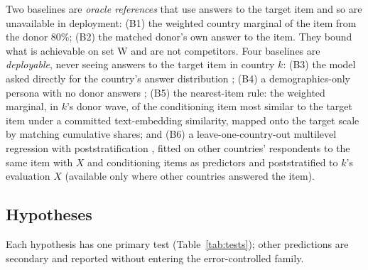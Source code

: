 \documentclass[10pt]{article}
\begin{document}
Two baselines are \emph{oracle references} that use answers to the target item and so are unavailable in deployment: (B1) the weighted country marginal of the item from the donor 80\%; (B2) the matched donor's own answer to the item. They bound what is achievable on set W and are not competitors. Four baselines are \emph{deployable}, never seeing answers to the target item in country $k$: (B3) the model asked directly for the country's answer distribution \citep{jang2026,meister2025}; (B4) a demographics-only persona with no donor answers \citep{argyle2023}; (B5) the nearest-item rule: the weighted marginal, in $k$'s donor wave, of the conditioning item most similar to the target item under a committed text-embedding similarity, mapped onto the target scale by matching cumulative shares; and (B6) a leave-one-country-out multilevel regression with poststratification \citep{park2004mrp,ghitza2013}, fitted on other countries' respondents to the same item with $X$ and conditioning items as predictors and poststratified to $k$'s evaluation $X$ (available only where other countries answered the item).

\subsection{Hypotheses}

Each hypothesis has one primary test (Table~\ref{tab:tests}); other predictions are secondary and reported without entering the error-controlled family.
\end{document}
